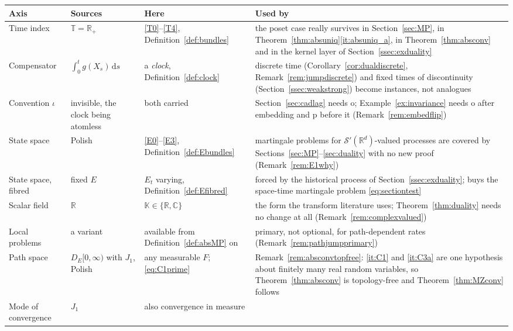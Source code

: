 \documentclass[11pt,a4paper]{article}
\theoremstyle{plain}
\theoremstyle{definition}
\theoremstyle{remark}
\newcommand{\R}{\mathbb{R}}
\newcommand{\Rp}{\R_+}
\newcommand{\T}{\mathbb{T}}                     %
\newcommand{\DE}{D_E[0,\infty)}
\newcommand{\K}{\mathbb{K}}
\newcommand{\C}{\mathbb{C}}
\newcommand{\dif}{\,\mathrm{d}}
\begin{document}
\begin{tabular}{@{}p{}p{}p{}p{}@{}}
\toprule
\textbf{Axis} & \textbf{Sources} & \textbf{Here} & \textbf{Used by} \\
\midrule
Time index
  & $\T = \Rp$
  & \eqref{T0}--\eqref{T4}, Definition~\ref{def:bundles}
  & the poset case really survives in Section~\ref{sec:MP}, in
    Theorem~\ref{thm:absuniq}\ref{it:absuniq_a}, in
    Theorem~\ref{thm:absconv} and in the kernel layer of
    Section~\ref{ssec:exduality} \\
Compensator
  & $\int_0^t g(X_s)\dif s$
  & a \emph{clock}, Definition~\ref{def:clock}
  & discrete time (Corollary~\ref{cor:dualdiscrete},
    Remark~\ref{rem:jumpdiscrete}) and fixed times of discontinuity
    (Section~\ref{ssec:weakstrong}) become instances, not analogues \\
Convention $\iota$
  & invisible, the clock being atomless
  & both carried
  & Section~\ref{sec:cadlag} needs $\mathrm{o}$;
    Example~\ref{ex:invariance} needs $\mathrm{o}$ after embedding and
    $\mathrm{p}$ before it (Remark~\ref{rem:embedflip}) \\
State space
  & Polish
  & \eqref{E0}--\eqref{E3}, Definition~\ref{def:Ebundles}
  & martingale problems for $\mathcal{S}'(\R^d)$-valued processes are covered by
    Sections~\ref{sec:MP}--\ref{sec:duality} with no new proof
    (Remark~\ref{rem:E1why}) \\
State space, fibred
  & fixed $E$
  & $E_t$ varying, Definition~\ref{def:Efibred}
  & forced by the historical process of Section~\ref{ssec:exduality}; buys the
    space-time martingale problem \eqref{eq:sectiontest} \\
Scalar field
  & $\R$
  & $\K \in \{\R,\C\}$
  & the form the transform literature uses; Theorem~\ref{thm:duality} needs no
    change at all (Remark~\ref{rem:complexvalued}) \\
Local problems
  & a variant
  & available from Definition~\ref{def:absMP} on
  & primary, not optional, for path-dependent rates
    (Remark~\ref{rem:pathjumpprimary}) \\
Path space
  & $\DE$ with $J_1$, Polish
  & any measurable $F$; \eqref{eq:C1prime}
  & Remark~\ref{rem:absconvtopfree}: \ref{it:C1} and \ref{it:C3a} are one
    hypothesis about finitely many real random variables, so
    Theorem~\ref{thm:absconv} is topology-free and
    Theorem~\ref{thm:MZconv} follows \\
Mode of convergence
  & $J_1$
  & also convergence in measure

\end{tabular}
\end{document}
